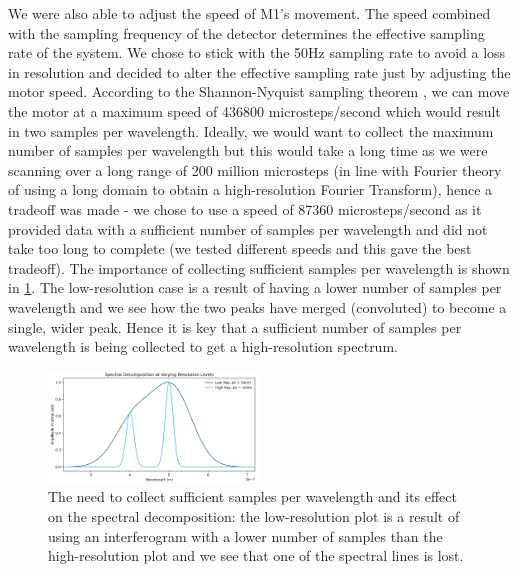 \documentclass[journal]{Imperial_lab_report}
\begin{document}
We were also able to adjust the speed of M1's movement. The speed combined with the sampling frequency of the detector determines the effective sampling rate of the system. We chose to stick with the 50Hz sampling rate to avoid a loss in resolution and decided to alter the effective sampling rate just by adjusting the motor speed. According to the Shannon-Nyquist sampling theorem \cite{shannon_ac1}\cite{shannon1}, we can move the motor at a maximum speed of 436800 microsteps/second which would result in two samples per wavelength. Ideally, we would want to collect the maximum number of samples per wavelength but this would take a long time as we were scanning over a long range of 200 million microsteps (in line with Fourier theory of using a long domain to obtain a high-resolution Fourier Transform), hence a tradeoff was made - we chose to use a speed of 87360 microsteps/second as it provided data with a sufficient number of samples per wavelength and did not take too long to complete (we tested different speeds and this gave the best tradeoff). The importance of collecting sufficient samples per wavelength is shown in \ref{fig:resolution}. The low-resolution case is a result of having a lower number of samples per wavelength and we see how the two peaks have merged (convoluted) to become a single, wider peak. Hence it is key that a sufficient number of samples per wavelength is being collected to get a high-resolution spectrum.

\begin{figure}[h]
\centering
\captionsetup{font=footnotesize}
    \includegraphics[width = 0.5\textwidth]{resolution (2).png}
    \caption{The need to collect sufficient samples per wavelength and its effect on the spectral decomposition: the low-resolution plot is a result of using an interferogram with a lower number of samples than the high-resolution plot and we see that one of the spectral lines is lost.}
    \label{fig:resolution}
\vspace{-12pt}
\end{figure}

\vspace{-5pt}
\end{document}
